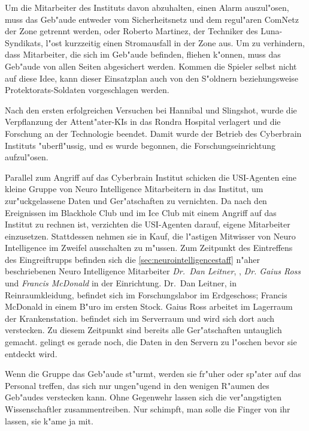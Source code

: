 Um die Mitarbeiter des Instituts davon abzuhalten, einen Alarm auszul"osen, muss das Geb"aude entweder vom Sicherheitsnetz und dem regul"aren ComNetz der Zone getrennt werden, oder Roberto Martinez, der Techniker des Luna-Syndikats, l"ost kurzzeitig einen Stromausfall in der Zone aus. Um zu verhindern, dass Mitarbeiter, die sich im Geb"aude befinden, fliehen k"onnen, muss das Geb"aude von allen Seiten abgesichert werden. Kommen die Spieler selbst nicht auf diese Idee, kann dieser Einsatzplan auch von den S"oldnern beziehungsweise Protektorats-Soldaten vorgeschlagen werden.

Nach den ersten erfolgreichen Versuchen bei Hannibal und Slingshot, wurde die Verpflanzung der Attent"ater-KIs in das Rondra Hospital verlagert und die Forschung an der Technologie beendet. Damit wurde der Betrieb des Cyberbrain Instituts "uberfl"ussig, und es wurde begonnen, die Forschungseinrichtung aufzul"osen. 

Parallel zum Angriff auf das Cyberbrain Institut schicken die USI-Agenten eine kleine Gruppe von Neuro Intelligence Mitarbeitern in das Institut, um zur"uckgelassene Daten und Ger"atschaften zu vernichten. Da nach den Ereignissen im Blackhole Club und im Ice Club mit einem Angriff auf das Institut zu rechnen ist, verzichten die USI-Agenten darauf, eigene Mitarbeiter einzusetzen. Stattdessen nehmen sie in Kauf, die l"astigen Mitwisser von Neuro Intelligence im Zweifel ausschalten zu m"ussen. Zum Zeitpunkt des Eintreffens des Eingreiftrupps befinden sich die \cref{sec:neurointelligencestaff} n"aher beschriebenen Neuro Intelligence Mitarbeiter \emph{Dr.~Dan Leitner}, \emph{\ml{}}, \emph{Dr. Gaius Ross} und \emph{Francis McDonald} in der Einrichtung. Dr.~Dan Leitner, in Reinraumkleidung, befindet sich im Forschungslabor im Erdgeschoss; Francis McDonald in einem B"uro im ersten Stock. Gaius Ross arbeitet im Lagerraum der Krankenstation. \ml{} befindet sich im Serverraum und wird sich dort auch verstecken. Zu diesem Zeitpunkt sind bereits alle Ger"atschaften untauglich gemacht. \ml{} gelingt es gerade noch, die Daten in den Servern zu l"oschen bevor sie entdeckt wird.

Wenn die Gruppe das Geb"aude st"urmt, werden sie fr"uher oder sp"ater auf das Personal treffen, das sich nur ungen"ugend in den wenigen R"aumen des Geb"audes verstecken kann. Ohne Gegenwehr lassen sich die ver"angstigten Wissenschaftler zusammentreiben. Nur \ml{} schimpft, man solle die Finger von ihr lassen, sie k"ame ja mit.

